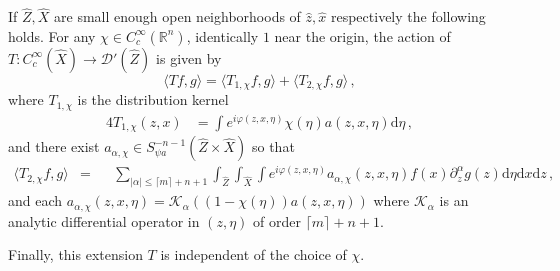 \documentclass[
	fontsize=11pt, 
	twoside=false, 
	abstract=true, 
	a4paper,
]{scrartcl}
\newcommand{\sem}{\setminus\{0\}}
\newcommand{\RR}{\mathbb{R}}
\newcommand{\dd}{\mathrm{d}}
\newcommand{\abs}[1]{\left\lvert#1\right\rvert}
\newcommand{\del}{\partial}
\begin{document}
\begin{lemma}\label{prop:oscint}
%
	If $\hat Z, \hat X$ are small enough open neighborhoods of $\hat z, \hat x$ respectively the following holds. For any $\chi \in C_c^\infty(\RR^n)$, identically $1$ near the origin, %
%
	the action of $T\colon C_c^\infty(\hat X) \to \mathcal{D}'(\hat Z)$ is given by
	\begin{equation*}
		\langle T f, g \rangle = \langle T_{1,\chi}f,g \rangle + \langle T_{2,\chi} f,g\rangle\,,
	\end{equation*}
	where $T_{1,\chi}$ is the distribution kernel
	\begin{alignat}{4}\label{eq:splitS}
		T_{1,\chi}(z,x) &= \int e^{i\varphi(z,x,\eta)} \chi(\eta)a(z,x,\eta) \dd\eta\,,%
	\end{alignat}
	and there exist $a_{\alpha,\chi} \in S^{-n-1}_{\psi a}(\hat Z\times\hat X)$ so that
	\begin{equation}
	\begin{alignedat}{2} \label{eq:S2action} 
		\langle T_{2,\chi} f, g \rangle &=& &\sum_{\abs{\alpha} \leq \lceil m\rceil +n+1}\int_{\hat Z}\int_{\hat X}\int e^{i\varphi(z,x,\eta)} a_{\alpha,\chi}(z,x,\eta) f(x) \del^{\alpha}_z g(z) \dd \eta \dd x \dd z\,, %
\end{alignedat}
	\end{equation}
	and each $a_{\alpha,\chi}(z,x,\eta) = \mathcal{K}_\alpha((1-\chi(\eta))a(z,x,\eta))$ where $\mathcal{K}_\alpha$ is an analytic differential operator in $(z,\eta)$ of order $\lceil m\rceil+n+1$.%

	Finally, this extension $T$ is independent of the choice of $\chi$.
\end{lemma}
\end{document}
